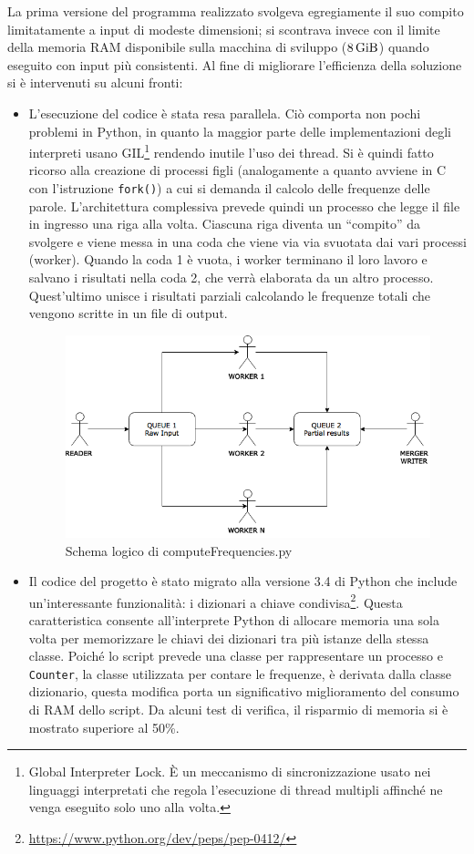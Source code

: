 La prima versione del programma realizzato svolgeva egregiamente il suo compito limitatamente a input di modeste dimensioni; si scontrava invece con il limite della memoria RAM disponibile sulla macchina di sviluppo ($\SI{8}{\gibi\byte}$) quando eseguito con input più consistenti.
Al fine di migliorare l'efficienza della soluzione si è intervenuti su alcuni fronti:
\begin{itemize}
\item L'esecuzione del codice è stata resa parallela. Ciò comporta non pochi problemi in Python, in quanto la maggior parte delle implementazioni degli interpreti usano GIL\footnote{Global Interpreter Lock. È un meccanismo di sincronizzazione usato nei linguaggi interpretati che regola l'esecuzione di thread multipli affinché ne venga eseguito solo uno alla volta.} rendendo inutile l'uso dei thread. Si è quindi fatto ricorso alla creazione di processi figli (analogamente a quanto avviene in C con l'istruzione \texttt{fork()}) a cui si demanda il calcolo delle frequenze delle parole. L'architettura complessiva prevede quindi un processo che legge il file in ingresso una riga alla volta. Ciascuna riga diventa un ``compito'' da svolgere e viene messa in una coda che viene via via svuotata dai vari processi (worker). Quando la coda 1 è vuota, i worker terminano il loro lavoro e salvano i risultati nella coda 2, che verrà elaborata da un altro processo. Quest'ultimo unisce i risultati parziali calcolando le frequenze totali che vengono scritte in un file di output.
\begin{figure}[h]
\centering
\includegraphics[width=\textwidth]{Figures/computeFrequencies.png}
\caption{Schema logico di computeFrequencies.py}
\end{figure}
\item Il codice del progetto è stato migrato alla versione 3.4 di Python che include un'interessante funzionalità: i dizionari a chiave condivisa\footnote{\url{https://www.python.org/dev/peps/pep-0412/}}. Questa caratteristica consente all'interprete Python di allocare memoria una sola volta per memorizzare le chiavi dei dizionari tra più istanze della stessa classe. Poiché lo script prevede una classe per rappresentare un processo e \texttt{Counter}, la classe utilizzata per contare le frequenze, è derivata dalla classe dizionario, questa modifica porta un significativo miglioramento del consumo di RAM dello script. Da alcuni test di verifica, il risparmio di memoria si è mostrato superiore al 50\%.

\end{itemize}
